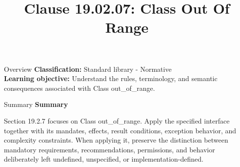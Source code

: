 \documentclass[10pt,letterpaper]{article}
\title{Clause 19.02.07: Class Out Of Range}
\author{}
\date{}
\begin{document}
\maketitle
\begin{CornellOverviewBox}{Overview}
\textbf{Classification:} Standard library - Normative\\[2pt]
\textbf{Learning objective:} Understand the rules, terminology, and semantic consequences associated with Class out\_of\_range.
\end{CornellOverviewBox}\begin{CornellSummaryBox}{Summary}
{\sffamily\bfseries\color{Accent} Summary}\par\vspace{3pt}Section 19.2.7 focuses on Class out\_of\_range. Apply the specified interface together with its mandates, effects, result conditions, exception behavior, and complexity constraints. When applying it, preserve the distinction between mandatory requirements, recommendations, permissions, and behavior deliberately left undefined, unspecified, or implementation-defined.
\end{CornellSummaryBox}
\end{document}
